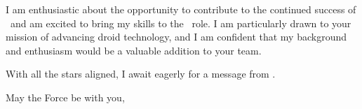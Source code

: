 \documentclass[10pt, a4paper]{article}
\begin{document}
I am enthusiastic about the opportunity to contribute to the continued success of \COMPANY\ and am excited to bring my skills to the \ROLE\ role. I am particularly drawn to your mission of advancing droid technology, and I am confident that my background and enthusiasm would be a valuable addition to your team.

With all the stars aligned, I await eagerly for a message from \COMPANY.

\bigskip

May the Force be with you,

\vspace{10pt}

\name
\end{document}
